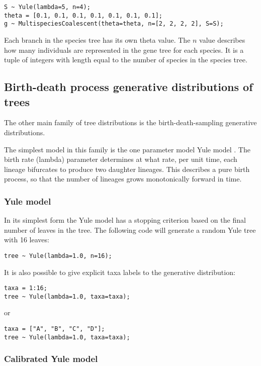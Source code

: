 \documentclass[oneside]{article}
\begin{document}
\begin{verbatim}
S ~ Yule(lambda=5, n=4);
theta = [0.1, 0.1, 0.1, 0.1, 0.1, 0.1, 0.1];
g ~ MultispeciesCoalescent(theta=theta, n=[2, 2, 2, 2], S=S);
\end{verbatim}

Each branch in the species tree has its own theta value.
The $n$ value describes how many individuals are represented in
the gene tree for each species.
It is a tuple of integers with length equal to the number of species
in the species tree.

\subsection{Birth-death process generative distributions of trees}

The other main family of tree distributions is the birth-death-sampling generative distributions.

The simplest model in this family is the one parameter model Yule model \cite{yule1925ii}. 
The birth rate (lambda) parameter determines at what rate, per unit time, each lineage bifurcates to produce two daughter lineages. 
This describes a pure birth process, so that the number of lineages grows monotonically forward in time. 

\subsubsection{Yule model}

In its simplest form the Yule model has a stopping criterion based on the final number of leaves in the tree. 
The following code will generate a random Yule tree with 16 leaves:

\begin{verbatim}
tree ~ Yule(lambda=1.0, n=16);
\end{verbatim}

It is also possible to give explicit taxa labels to the generative distribution:

\begin{verbatim}
taxa = 1:16;
tree ~ Yule(lambda=1.0, taxa=taxa);
\end{verbatim}

or

\begin{verbatim}
taxa = ["A", "B", "C", "D"];
tree ~ Yule(lambda=1.0, taxa=taxa);
\end{verbatim}

\subsubsection{Calibrated Yule model}
\end{document}
